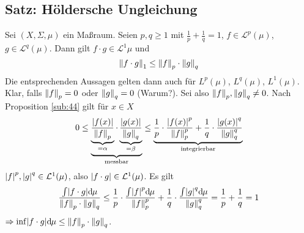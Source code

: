\subsection{Satz: Höldersche Ungleichung} %
\label{sub:45}
Sei $(X,\Sigma,\mu)$ ein Maßraum. Seien $p,q \ge 1$ mit $\frac{1}{p} +\frac{1}{q}=1 $, $f \in \mathcal{L}^p(\mu)$, $g \in \mathcal{L}^q(\mu)$. Dann gilt 
$f \cdot g \in \mathcal{L}^1{\mu}$ und
\[
	\norm[1]{f \cdot g} \le \norm[p]{f} \cdot \norm[q]{g}   
\]
Die entsprechenden Aussagen gelten dann auch für $L^p(\mu)$, $L^q(\mu)$, $L^1(\mu)$.
Klar, falls $\norm[p]{f} =0 $ oder $\norm[q]{g} =0$ (Warum?). Sei also $\norm[p]{f}, \norm[q]{g} \not= 0$. Nach Proposition \ref{sub:44} gilt für $x \in X$
\[
	0 \le \underbrace{\underbrace{\frac{\abs*{f(x)} }{\norm[p]{f}}}_{=\alpha} \cdot \underbrace{\frac{\abs*{g(x)} }{\norm[q]{g} }}_{=\beta} }_{\text{messbar}}
	\le \underbrace{\frac{1}{p} \cdot \frac{\abs*{f(x)}^p }{\norm[p]{f}^p } + \frac{1}{q} \cdot \frac{\abs*{g(x)}^q }{\norm[q]{g}^q }}_{\text{integrierbar}}
\]
$\abs*{f}^p , \abs*{g}^q  \in \mathcal{L}^1(\mu)$, also $\abs*{ f \cdot g } \in \mathcal{L}^1(\mu)$. Es gilt
\begin{align*}
	\frac{\int \abs*{f \cdot g} \mathd \mu}{\norm[p]{f} \cdot \norm[q]{g}} \le \frac{1}{p} \cdot \frac{\int \abs*{f}^p \mathd \mu }{\norm[p]{f}^p } +
	\frac{1}{q} \cdot \frac{\int \abs*{g}^q \mathd \mu }{\norm[q]{g}^q} = \frac{1}{p} + \frac{1}{q} = 1       
\end{align*}
$\Rightarrow \inf \abs*{f \cdot g} \mathd \mu  \le \norm[p]{f}  \cdot \norm[q]{g}$. \bewende


